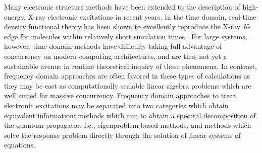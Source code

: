 Many electronic structure methods have been extended to the
description of high-energy, X-ray electronic excitations in recent years. In
the time domain, real-time density functional theory \cite{Li05_233,Li07_199,Li11_184102} has been shown to
excellently reproduce the X-ray \emph{K}-edge for molecules within relatively
short simulation times \cite{Govind12_3284,Lopata16_3741}. For large systems,
however, time-domain methods have difficulty taking full advantage of
concurrency on modern computing architectures, and are thus not yet a
sustainable avenue in routine theoretical inquiry of these phenomena. In contrast,
frequency domain approaches are often favored in these types of calculations as
they may be cast as computationally scalable linear algebra problems which are
well suited for massive concurrency. Frequency domain approaches to treat
electronic excitations may be separated into two categories which obtain equivalent information:
methods which aim to obtain a spectral decomposition of the quantum propagator, i.e., eigenproblem based methods, and methods which solve the response problem directly through the solution of linear systems of equations. 

